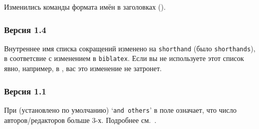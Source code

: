 \documentclass[10pt,a4paper,headings=small,numbers=enddot,english,russian]{ltxdockit}
\newcommand*{\biber}{Biber\xspace}
\newcommand*{\biblatex}{Biblatex\xspace}
\begin{document}
\begin{trivlist}
\item Изменились команды формата имён в
  заголовках ().
\end{trivlist}

\subsubsection*{Версия 1.4}

\begin{trivlist}
\item Внутреннее имя списка сокращений изменено на \texttt{shorthand} (было
  \texttt{shorthands}), в соответсвие с изменением в \texttt{biblatex}.
  Если вы не используете этот список явно, например, в , вас это
  изменение не затронет.
\end{trivlist}

\subsubsection*{Версия 1.1}

\begin{trivlist}
\item При  (установлено по умолчанию) `\texttt{and others}' 
  в поле 
  означает, что число авторов/редакторов больше 3-х. Подробнее см.~.
\end{trivlist}



% 
\end{document}
